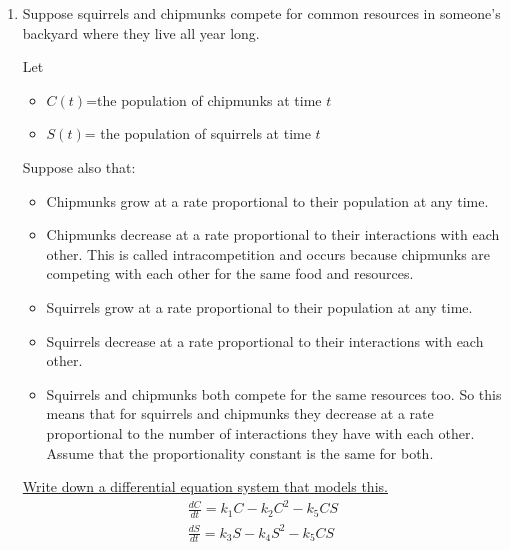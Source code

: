 \documentclass[12pt,letterpaper]{article}
\begin{document}
\begin{enumerate}
\begin{enumerate}
\end{enumerate}

\item  Suppose squirrels and chipmunks compete for common resources in someone's backyard where they live all year long.


Let
\begin{itemize}
\item $C(t)$=the population of chipmunks at time $t$
\item $S(t)$= the population of squirrels at time $t$
\end{itemize}

Suppose also that:
\begin{itemize}
\item Chipmunks grow at a rate proportional to their population at any time.

\item Chipmunks decrease at a rate proportional to their interactions with each other.  This is called intracompetition and occurs because chipmunks are competing with each other for the same food and resources.

\item Squirrels grow at a rate proportional to their population at any time.

\item Squirrels  decrease at a rate proportional to their interactions with each other.  

\item Squirrels and chipmunks both compete for the same resources too. So this means that for squirrels and chipmunks they decrease at a rate proportional to the number of interactions they have with each other.  Assume that the proportionality constant is the same for both. 

\end{itemize}

\underline{ Write down a differential equation system that models this. }
\begin{gather}
  \frac{dC}{dt} = k_{1}C - k_{2}C^2 - k_{5}CS\\
  \frac{dS}{dt} = k_{3}S - k_{4}S^2 - k_{5}CS 
\end{gather}


\end{enumerate}
\end{document}
